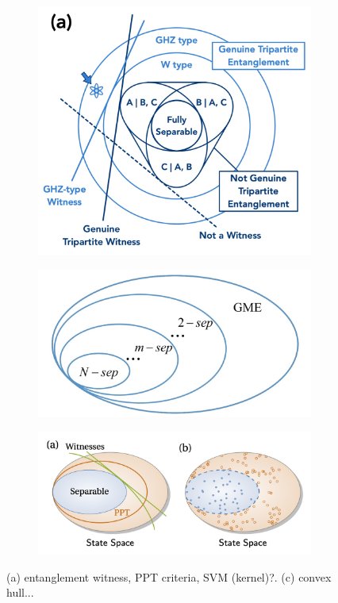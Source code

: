 \documentclass[
10pt,
aps,
pra,
linenumbers,
floatfix,
]{revtex4-2}
\theoremstyle{plain}
\theoremstyle{definition}
\begin{document}
\begin{figure}[!ht]
	\centering
	\begin{subfigure}{0.3\textwidth}
		\centering
		\includegraphics[width=.9\linewidth]{gme.jpg}
	\end{subfigure}
	\begin{subfigure}{0.3\textwidth}
		\centering
		\includegraphics[width=.8\linewidth]{sep.jpg}
	\end{subfigure}
	\begin{subfigure}{0.35\textwidth}
		\centering
		\includegraphics[width=.9\linewidth]{ppt.jpg}
	\end{subfigure}
	\caption{(a) entanglement witness, PPT criteria, SVM (kernel)?. (c) convex hull... }
	\label{fig:entangle}
\end{figure}
\end{document}
